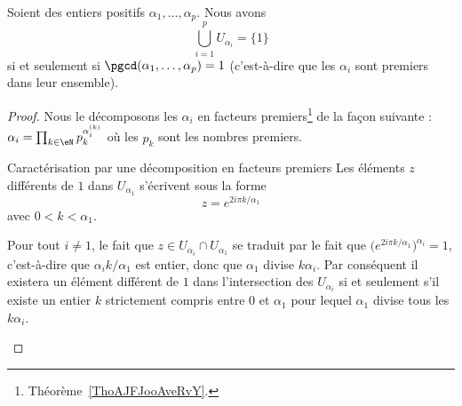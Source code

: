 \begin{proposition}  \label{PropFDDHooEyYxBC}
    Soient des entiers positifs \( \alpha_1,\ldots, \alpha_p\). Nous avons
    \begin{equation}
        \bigcup_{i=1}^pU_{\alpha_i}=\{ 1 \}
    \end{equation}
    si et seulement si \( \pgcd(\alpha_1,\ldots, \alpha_p)=1\) (c'est-à-dire que les \( \alpha_i\) sont premiers dans leur ensemble).
\end{proposition}

\begin{proof}
    Nous le décomposons les \( \alpha_i\) en facteurs premiers\footnote{Théorème~\ref{ThoAJFJooAveRvY}.} de la façon suivante : \( \alpha_i=\prod_{k\in \eN}p_k^{\alpha_i^{(k)}}\) où les \( p_k\) sont les nombres premiers.

    \begin{subproof}
    \item[Caractérisation par une décomposition en facteurs premiers]
        Les éléments \( z\) différents de \( 1\) dans \( U_{\alpha_1}\) s'écrivent sous la forme
        \begin{equation}
            z= e^{2i\pi k/\alpha_1}
        \end{equation}
        avec \( 0<k<\alpha_1\).

        Pour tout \( i\neq 1\), le fait que \( z\in U_{\alpha_i}\cap U_{\alpha_1}\) se traduit par le fait que \( \big(  e^{2i\pi k/\alpha_1} \big)^{\alpha_i}=1\), c'est-à-dire que \( \alpha_ik/\alpha_1\) est entier, donc que \( \alpha_1\) divise \( k\alpha_i\). Par conséquent il existera un élément différent de \( 1\) dans l'intersection des \( U_{\alpha_i}\) si et seulement s'il existe un entier \( k\) strictement compris entre \( 0\) et \( \alpha_1\) pour lequel \( \alpha_1\) divise tous les \( k\alpha_i\).


\end{subproof}
\end{proof}
